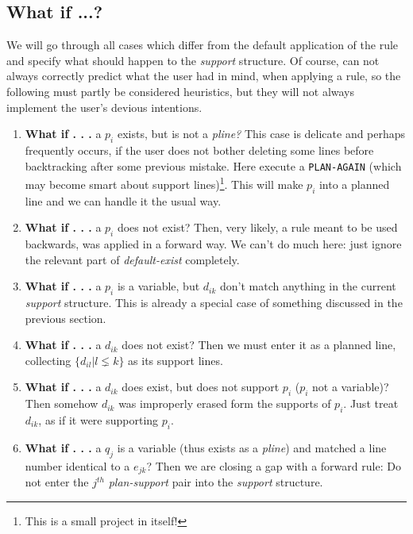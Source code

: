\subsection{What if ...?}

We will go through all cases which differ from the default application
of the rule and specify what should happen to the {\it support} structure.
Of course, \TPS can not always correctly predict what the user had in
mind, when applying a rule, so the following must partly be considered
heuristics, but they will not always implement the user's devious
intentions.

\begin{enumerate}

\item \label{backtrack} %
{\bf What if . . . } a $p_i$ exists, but is not a {\it pline?}  This case is
delicate and perhaps frequently occurs, if the user does not bother deleting
some lines before backtracking after some previous mistake.  Here execute
a {\tt PLAN-AGAIN} (which may become smart about support lines)\footnote{This is
a small project in itself!}.  This will make $p_i$ into a planned line and
we can handle it the usual way.

\item {\bf What if . . . } a $p_i$ does not exist?  Then, very likely, a rule meant to be used
backwards, was applied in a forward way.  We can't do much here: just ignore
the relevant part of {\it default-exist} completely.

\item {\bf What if . . . } a $p_i$ is a variable, but $d_{ik}$ don't match anything in the current
{\it support} structure.  This is already a special case of something discussed
in the previous section.

\item {\bf What if . . . } a $d_{ik}$ does not exist?  Then we must enter it as a planned line, collecting
$\{d_{il} | l \lneq k\}$ as its support lines.

\item {\bf What if . . . } a $d_{ik}$ does exist, but does not support $p_i$ ($p_i$ not a variable)?  Then
somehow $d_{ik}$ was improperly erased form the supports of $p_i$.
Just treat $d_{ik}$, as if it were supporting $p_i$.

\item {\bf What if . . . } a $q_j$ is a variable (thus exists as a {\it pline})
and matched a line number identical to a $e_{jk}$?  Then we are closing a
gap with a forward rule:  Do not enter the $j^{th}$ {\it plan-support} pair
into the {\it support} structure.


\end{enumerate}

